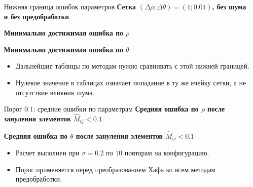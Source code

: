 \documentclass[unicode,notheorems]{beamer}
\begin{document}
\begin{frame}{Нижняя граница ошибок параметров}
	\scriptsize
	\centering
	\textbf{Сетка $(\Delta\rho;\Delta\theta)=(1;0.01)$, без шума и без предобработки}

	\vspace{0.08cm}
	\textbf{Минимально достижимая ошибка по $\rho$}
	\par\vspace{0.04cm}
	{
	\renewcommand{\arraystretch}{0.9}
	\setlength{\tabcolsep}{2pt}
	\resizebox{\textwidth}{!}{}
	}

	\vspace{0.14cm}
	\textbf{Минимально достижимая ошибка по $\theta$}
	\par\vspace{0.04cm}
	{
	\renewcommand{\arraystretch}{0.9}
	\setlength{\tabcolsep}{2pt}
	\resizebox{\textwidth}{!}{}
	}

	\vspace{0.12cm}
	\begin{itemize}
		\setlength{\itemsep}{0pt}
		\item Дальнейшие таблицы по методам нужно сравнивать с этой нижней границей.
		\item Нулевое значение в таблицах означает попадание в ту же ячейку сетки, а не отсутствие влияния шума.
	\end{itemize}
\end{frame}

\begin{frame}{Порог $0.1$: средние ошибки по параметрам}
	\scriptsize
	\centering
	\textbf{Средняя ошибка по $\rho$ после зануления элементов $\widehat M_{ij}<0.1$}
	\par\vspace{0.06cm}
	{
	\renewcommand{\arraystretch}{0.9}
	\setlength{\tabcolsep}{2pt}
	\resizebox{\textwidth}{!}{}
	}

	\vspace{0.18cm}
	\textbf{Средняя ошибка по $\theta$ после зануления элементов $\widehat M_{ij}<0.1$}
	\par\vspace{0.06cm}
	{
	\renewcommand{\arraystretch}{0.9}
	\setlength{\tabcolsep}{2pt}
	\resizebox{\textwidth}{!}{}
	}

	\vspace{0.12cm}
	\begin{itemize}
		\setlength{\itemsep}{0pt}
		\item Расчет выполнен при $\sigma=0.2$ по $10$ повторам на конфигурацию.
		\item Порог применяется перед преобразованием Хафа ко всем методам предобработки.
	\end{itemize}
\end{frame}
\end{document}
